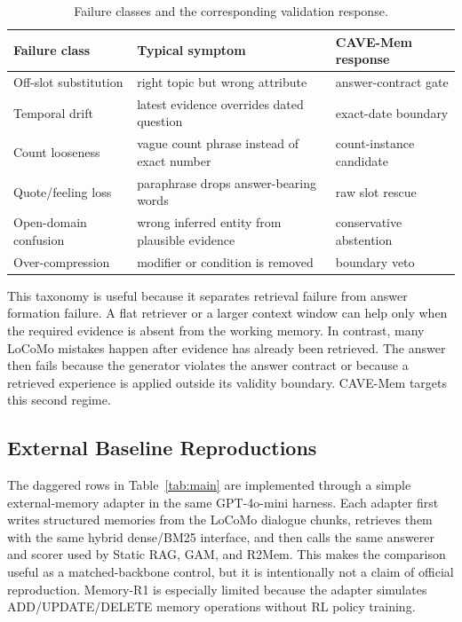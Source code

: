 \documentclass[conference]{IEEEtran}
\newcommand{\method}{CAVE-Mem}
\begin{document}
\begin{table}[t]
\caption{Failure classes and the corresponding validation response.}
\label{tab:taxonomy}
\centering
\scriptsize
\setlength{\tabcolsep}{2pt}
\begin{tabular}{p{}p{}p{}}
\toprule
Failure class & Typical symptom & \method{} response \\
\midrule
Off-slot substitution & right topic but wrong attribute & answer-contract gate \\
Temporal drift & latest evidence overrides dated question & exact-date boundary \\
Count looseness & vague count phrase instead of exact number & count-instance candidate \\
Quote/feeling loss & paraphrase drops answer-bearing words & raw slot rescue \\
Open-domain confusion & wrong inferred entity from plausible evidence & conservative abstention \\
Over-compression & modifier or condition is removed & boundary veto \\
\bottomrule
\end{tabular}
\end{table}

This taxonomy is useful because it separates retrieval failure from answer
formation failure. A flat retriever or a larger context window can help only
when the required evidence is absent from the working memory. In contrast,
many LoCoMo mistakes happen after evidence has already been retrieved. The
answer then fails because the generator violates the answer contract or because
a retrieved experience is applied outside its validity boundary. \method{}
targets this second regime.

\subsection{External Baseline Reproductions}
The daggered rows in Table~\ref{tab:main} are implemented through a simple
external-memory adapter in the same GPT-4o-mini harness. Each adapter first
writes structured memories from the LoCoMo dialogue chunks, retrieves them
with the same hybrid dense/BM25 interface, and then calls the same answerer
and scorer used by Static RAG, GAM, and R2Mem. This makes the comparison
useful as a matched-backbone control, but it is intentionally not a claim of
official reproduction. Memory-R1 is especially limited because the adapter
simulates ADD/UPDATE/DELETE memory operations without RL policy training.
\end{document}
